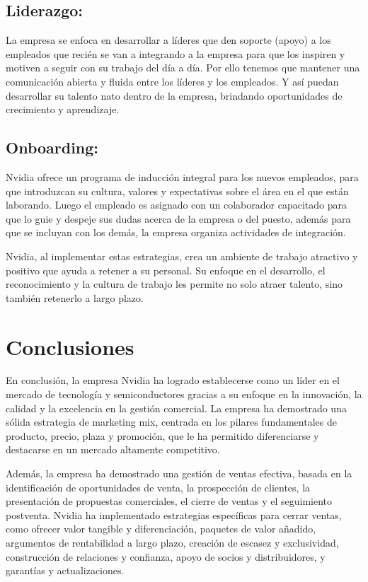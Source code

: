 \documentclass{article}
\begin{document}
\subsection{Liderazgo:}

La empresa se enfoca en desarrollar a líderes que den soporte (apoyo) a los empleados que recién se van a integrando a la empresa para que los inspiren y motiven a seguir con su trabajo del día a día. Por ello tenemos que mantener una comunicación abierta y fluida entre los líderes y los empleados. Y así puedan desarrollar su talento nato dentro de la empresa, brindando oportunidades de crecimiento y aprendizaje.

\subsection{Onboarding:}

Nvidia ofrece un programa de inducción integral para los nuevos empleados, para que introduzcan su cultura, valores y expectativas sobre el área en el que están laborando. Luego el empleado es asignado con un colaborador capacitado para que lo guie y despeje sus dudas acerca de la empresa o del puesto, además para que se incluyan con los demás, la empresa organiza actividades de integración.

Nvidia, al implementar estas estrategias, crea un ambiente de trabajo atractivo y positivo que ayuda a retener a su personal. Su enfoque en el desarrollo, el reconocimiento y la cultura de trabajo les permite no solo atraer talento, sino también retenerlo a largo plazo.

\section{Conclusiones}

En conclusión, la empresa Nvidia ha logrado establecerse como un líder en el mercado de tecnología y semiconductores gracias a su enfoque en la innovación, la calidad y la excelencia en la gestión comercial. La empresa ha demostrado una sólida estrategia de marketing mix, centrada en los pilares fundamentales de producto, precio, plaza y promoción, que le ha permitido diferenciarse y destacarse en un mercado altamente competitivo.

Además, la empresa ha demostrado una gestión de ventas efectiva, basada en la identificación de oportunidades de venta, la prospección de clientes, la presentación de propuestas comerciales, el cierre de ventas y el seguimiento postventa. Nvidia ha implementado estrategias específicas para cerrar ventas, como ofrecer valor tangible y diferenciación, paquetes de valor añadido, argumentos de rentabilidad a largo plazo, creación de escasez y exclusividad, construcción de relaciones y confianza, apoyo de socios y distribuidores, y garantías y actualizaciones.
\end{document}
